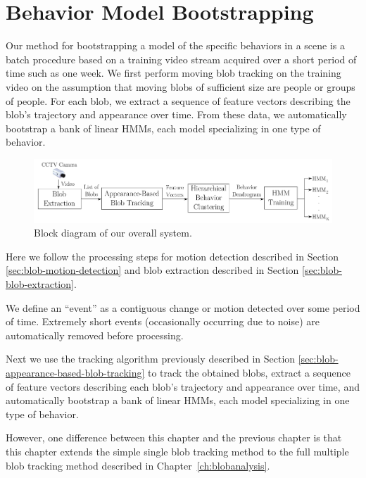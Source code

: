 \section{Behavior Model Bootstrapping}
\label{sec:batch-modeling}

Our method for bootstrapping a model of the specific behaviors in a
scene is a batch procedure based on a training video stream acquired
over a short period of time such as one week.  We first perform moving
blob tracking on the training video on the assumption that moving
blobs of sufficient size are people or groups of people.  For each
blob, we extract a sequence of feature vectors describing the blob's
trajectory and appearance over time.  From these data, we
automatically bootstrap a bank of linear HMMs, each model specializing
in one type of behavior.

\begin{figure}[t]
  \centering
  \includegraphics[width=1\linewidth]{figures/behavior-modeling-block-diagram}
  \caption[Block diagram of our overall system.]{\small Block diagram
    of our overall system.}
  \label{fig:behavior-modeling-block-diagram}
\end{figure}

Here we follow the processing steps for motion detection described in
Section \ref{sec:blob-motion-detection} and blob extraction described
in Section \ref{sec:blob-blob-extraction}. 

We define an ``event'' as a contiguous change or motion detected over
some period of time. Extremely short events (occasionally occurring
due to noise) are automatically removed before processing.

Next we use the tracking algorithm previously described in
Section \ref{sec:blob-appearance-based-blob-tracking} to track the
obtained blobs, extract a sequence of feature vectors describing each
blob's trajectory and appearance over time, and automatically
bootstrap a bank of linear HMMs, each model specializing in one type
of behavior.

However, one difference between this chapter and the previous chapter
is that this chapter extends the simple single blob tracking method to
the full multiple blob tracking method described in
Chapter~\ref{ch:blobanalysis}.

